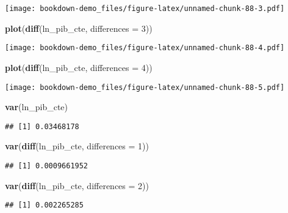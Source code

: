 \documentclass[]{book}
\newenvironment{Shaded}{\begin{snugshade}}{\end{snugshade}}
\newcommand{\KeywordTok}[1]{\textcolor[rgb]{0.13,0.29,0.53}{\textbf{#1}}}
\newcommand{\DataTypeTok}[1]{\textcolor[rgb]{0.13,0.29,0.53}{#1}}
\newcommand{\DecValTok}[1]{\textcolor[rgb]{0.00,0.00,0.81}{#1}}
\newcommand{\NormalTok}[1]{#1}
\theoremstyle{definition}
\theoremstyle{definition}
\theoremstyle{definition}
\theoremstyle{remark}
\begin{document}
\texttt{[image: bookdown-demo\_files/figure-latex/unnamed-chunk-88-3.pdf]}

\begin{Shaded}
\begin{Highlighting}[]
\KeywordTok{plot}\NormalTok{(}\KeywordTok{diff}\NormalTok{(ln_pib_cte, }\DataTypeTok{differences =} \DecValTok{3}\NormalTok{))}
\end{Highlighting}
\end{Shaded}

\texttt{[image: bookdown-demo\_files/figure-latex/unnamed-chunk-88-4.pdf]}

\begin{Shaded}
\begin{Highlighting}[]
\KeywordTok{plot}\NormalTok{(}\KeywordTok{diff}\NormalTok{(ln_pib_cte, }\DataTypeTok{differences =} \DecValTok{4}\NormalTok{))}
\end{Highlighting}
\end{Shaded}

\texttt{[image: bookdown-demo\_files/figure-latex/unnamed-chunk-88-5.pdf]}

\begin{Shaded}
\begin{Highlighting}[]
\KeywordTok{var}\NormalTok{(ln_pib_cte)}
\end{Highlighting}
\end{Shaded}

\begin{verbatim}
## [1] 0.03468178
\end{verbatim}

\begin{Shaded}
\begin{Highlighting}[]
\KeywordTok{var}\NormalTok{(}\KeywordTok{diff}\NormalTok{(ln_pib_cte, }\DataTypeTok{differences =} \DecValTok{1}\NormalTok{))}
\end{Highlighting}
\end{Shaded}

\begin{verbatim}
## [1] 0.0009661952
\end{verbatim}

\begin{Shaded}
\begin{Highlighting}[]
\KeywordTok{var}\NormalTok{(}\KeywordTok{diff}\NormalTok{(ln_pib_cte, }\DataTypeTok{differences =} \DecValTok{2}\NormalTok{))}
\end{Highlighting}
\end{Shaded}

\begin{verbatim}
## [1] 0.002265285
\end{verbatim}
\end{document}
